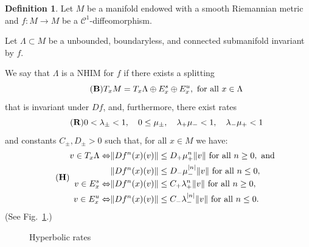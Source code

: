 \documentclass[11pt]{amsart}
\theoremstyle{definition}
\newtheorem{defn}[thm]{Definition}
\theoremstyle{remark}
\numberwithin{equation}{section}
\newcommand{\C}{\mathcal{C}}
\begin{document}
\begin{defn} \label{def:nhim}
Let $M$ be a manifold endowed with a smooth Riemannian metric and $f:M\to M$ be a $\C^1$-diffeomorphism.


Let $\Lambda\subset M$ be a unbounded, boundaryless,
and connected submanifold invariant  by $f$.

We say that $\Lambda$ is a NHIM for $f$ if there exists a splitting
\begin{equation}
\label{eq:bundles}\tag{{\bf B}}
T_xM=T_x\Lambda\oplus  E_x^s\oplus E_x^u, \textrm{ for all }x\in \Lambda
\end{equation}
that is invariant under $Df$, and, furthermore, there exist rates
\begin{equation}\label{eq:rates0}\tag{{\bf R}}
0<\lambda_\pm<1, \quad 0\leq  \mu_\pm, \quad \lambda_+\mu_-<1, \quad \lambda_-\mu_+<1
\end{equation}
and constants $C_\pm, D_\pm>0$ such that, for all $x\in M$ we have:
\begin{equation}\label{eqn:NHIM}\tag{{\bf H}}
\begin{split}
v\in T_x\Lambda\Leftrightarrow&\| Df^n(x)(v)\|\leq D_+\mu_+^n\|v\| \textrm{ for all } n\geq 0, \textrm { and }\\
 &\| Df^n(x)(v)\|\leq D_-\mu_-^{|n|}\|v\| \textrm{ for all } n\leq 0,\\
 v\in E_x^s \Leftrightarrow&\| Df^n(x)(v)\|\leq C_+\lambda_+^n\|v\| \textrm{ for all } n\geq 0,\\
 v\in E_x^u \Leftrightarrow&\| Df^n(x)(v)\|\leq C_-\lambda_-^{|n|}\|v\| \textrm{ for all } n\leq 0.
\end{split}
\end{equation}
(See Fig.~\ref{fig:rates}.)
\end{defn}


\begin{center}
\begin{figure}[h]
\caption{Hyperbolic rates}
\label{fig:rates}
\end{figure}
\end{center}
\end{document}
